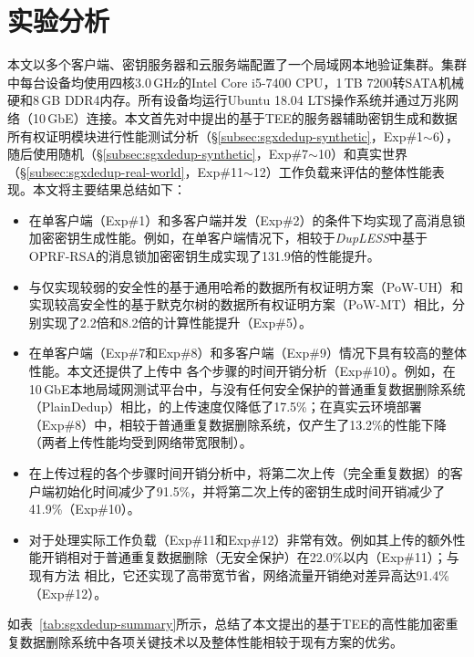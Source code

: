 \section{实验分析}
\label{sec:sgxdedup-evaluation}

本文以多个客户端、密钥服务器和云服务端配置了一个局域网本地验证集群。集群中每台设备均使用四核3.0\,GHz的Intel Core i5-7400 CPU，1\,TB 7200转SATA机械硬和8\,GB DDR4内存。所有设备均运行Ubuntu 18.04 LTS操作系统并通过万兆网络（10\,GbE）连接。本文首先对\sysnameS 中提出的基于TEE的服务器辅助密钥生成和数据所有权证明模块进行性能测试分析（\S\ref{subsec:sgxdedup-synthetic}，Exp\#1$\sim$6），随后使用随机（\S\ref{subsec:sgxdedup-synthetic}，Exp\#7$\sim$10）和真实世界（\S\ref{subsec:sgxdedup-real-world}，Exp\#11$\sim$12）工作负载来评估\sysnameS 的整体性能表现。本文将主要结果总结如下：

\begin{itemize}
    \item \sysnameS 在单客户端（Exp\#1）和多客户端并发（Exp\#2）的条件下均实现了高消息锁加密密钥生成性能。例如，在单客户端情况下，相较于{\em DupLESS}\cite{bellare2013DupLESS}中基于OPRF-RSA的消息锁加密密钥生成实现了131.9倍的性能提升。
    \item \sysnameS 与仅实现较弱的安全性的基于通用哈希的数据所有权证明方案（PoW-UH）\cite{xu2013weak}和实现较高安全性的基于默克尔树的数据所有权证明方案（PoW-MT）\cite{halevi11}相比，分别实现了2.2倍和8.2倍的计算性能提升（Exp\#5）。
    \item \sysnameS 在单客户端（Exp\#7和Exp\#8）和多客户端（Exp\#9）情况下具有较高的整体性能。本文还提供了上传中 \sysnameS 各个步骤的时间开销分析（Exp\#10）。例如，在10\,GbE本地局域网测试平台中，与没有任何安全保护的普通重复数据删除系统（PlainDedup）相比，\sysnameS 的上传速度仅降低了17.5\%；在真实云环境部署（Exp\#8）中，相较于普通重复数据删除系统，\sysnameS 仅产生了13.2\%的性能下降（两者上传性能均受到网络带宽限制）。
    \item 在上传过程的各个步骤时间开销分析中，\sysnameS 将第二次上传（完全重复数据）的客户端初始化时间减少了91.5\%，并将第二次上传的密钥生成时间开销减少了41.9\%（Exp\#10）。
    \item \sysnameS 对于处理实际工作负载（Exp\#11和Exp\#12）非常有效。例如其上传的额外性能开销相对于普通重复数据删除（无安全保护）在22.0\%以内（Exp\#11）；与现有方法\cite{li15,harnik2010side} 相比，它还实现了高带宽节省，网络流量开销绝对差异高达91.4\%（Exp\#12）。
\end{itemize}

如表~\ref{tab:sgxdedup-summary}所示，总结了本文提出的基于TEE的高性能加密重复数据删除系统\sysnameS 中各项关键技术以及整体性能相较于现有方案的优劣。

